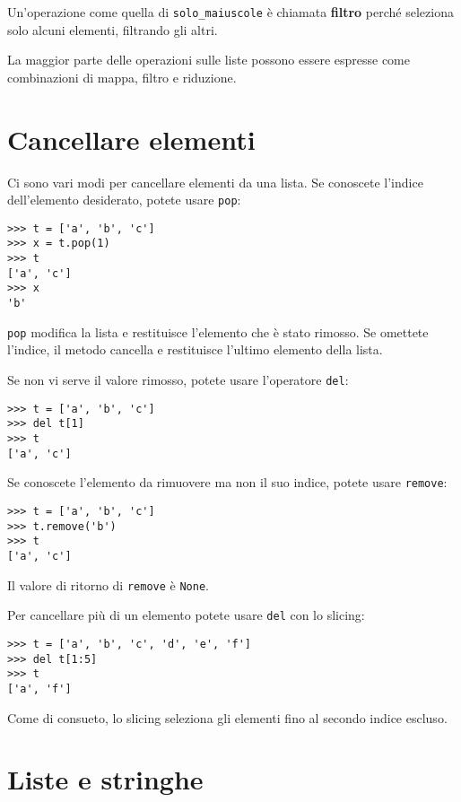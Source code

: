 \documentclass[10pt]{book}
\begin{document}
Un'operazione come quella di \verb"solo_maiuscole" è chiamata {\bf filtro} perché seleziona solo alcuni elementi, filtrando gli altri.

La maggior parte delle operazioni sulle liste possono essere espresse come combinazioni di mappa, filtro e riduzione.

\section{Cancellare elementi}

Ci sono vari modi per cancellare elementi da una lista. Se conoscete l'indice dell'elemento desiderato, potete usare
{\tt pop}:

\begin{verbatim}
>>> t = ['a', 'b', 'c']
>>> x = t.pop(1)
>>> t
['a', 'c']
>>> x
'b'
\end{verbatim}
%
{\tt pop} modifica la lista e restituisce l'elemento che è stato rimosso. Se omettete l'indice, il metodo cancella e restituisce l'ultimo elemento della lista.

Se non vi serve il valore rimosso, potete usare l'operatore {\tt del}:

\begin{verbatim}
>>> t = ['a', 'b', 'c']
>>> del t[1]
>>> t
['a', 'c']
\end{verbatim}
%

Se conoscete l'elemento da rimuovere ma non il suo indice, potete usare {\tt remove}:

\begin{verbatim}
>>> t = ['a', 'b', 'c']
>>> t.remove('b')
>>> t
['a', 'c']
\end{verbatim}
%
Il valore di ritorno di {\tt remove} è {\tt None}.

Per cancellare più di un elemento potete usare {\tt del} con lo slicing:

\begin{verbatim}
>>> t = ['a', 'b', 'c', 'd', 'e', 'f']
>>> del t[1:5]
>>> t
['a', 'f']
\end{verbatim}
%
Come di consueto, lo slicing seleziona gli elementi fino al secondo indice escluso.

\section{Liste e stringhe}
\end{document}

